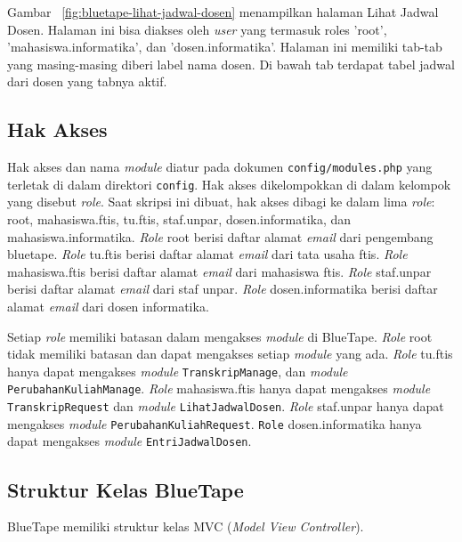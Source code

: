 	Gambar~ \ref{fig:bluetape-lihat-jadwal-dosen} menampilkan halaman Lihat Jadwal Dosen. Halaman ini bisa diakses oleh \textit{user} yang termasuk roles 'root', 'mahasiswa.informatika', dan 'dosen.informatika'. Halaman ini memiliki tab-tab yang masing-masing diberi label nama dosen. Di bawah tab terdapat tabel jadwal dari dosen yang tabnya aktif.

\subsection{Hak Akses}
	Hak akses dan nama \textit{module} diatur pada dokumen \texttt{config/modules.php} yang terletak di dalam direktori \texttt{config}. Hak akses dikelompokkan di dalam kelompok yang disebut \textit{role}. Saat skripsi ini dibuat, hak akses dibagi ke dalam lima \textit{role}: root, mahasiswa.ftis, tu.ftis, staf.unpar, dosen.informatika, dan mahasiswa.informatika. \textit{Role} root berisi daftar alamat \textit{email} dari pengembang bluetape. \textit{Role} tu.ftis berisi daftar alamat \textit{email} dari tata usaha ftis. \textit{Role} mahasiswa.ftis berisi daftar alamat \textit{email} dari mahasiswa ftis. \textit{Role} staf.unpar berisi daftar alamat \textit{email} dari staf unpar. \textit{Role} dosen.informatika berisi daftar alamat \textit{email} dari dosen informatika.

	Setiap \textit{role} memiliki batasan dalam mengakses \textit{module} di BlueTape. \textit{Role} root tidak memiliki batasan dan dapat mengakses setiap \textit{module} yang ada. \textit{Role} tu.ftis hanya dapat mengakses \textit{module} \texttt{TranskripManage}, dan \textit{module} \texttt{PerubahanKuliahManage}. \textit{Role} mahasiswa.ftis hanya dapat mengakses \textit{module} \texttt{TranskripRequest} dan \textit{module} \texttt{LihatJadwalDosen}. \textit{Role} staf.unpar hanya dapat mengakses \textit{module} \texttt{PerubahanKuliahRequest}. \texttt{Role} dosen.informatika hanya dapat mengakses \textit{module} \texttt{EntriJadwalDosen}.

\subsection{Struktur Kelas BlueTape}
BlueTape memiliki struktur kelas MVC (\textit{Model View Controller}).

